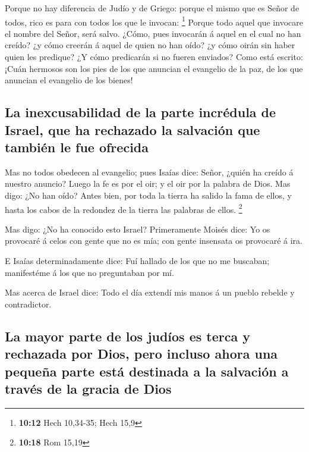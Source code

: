  Porque no hay diferencia de Judío y de Griego: porque el
mismo que es Señor de todos, rico es para con todos los que le invocan:
\footnote{\textbf{10:12} Hech 10,34-35; Hech 15,9}  Porque
todo aquel que invocare el nombre del Señor, será salvo. 
¿Cómo, pues invocarán á aquel en el cual no han creído? ¿y cómo creerán
á aquel de quien no han oído? ¿y cómo oirán sin haber quien les
predique?  ¿Y cómo predicarán si no fueren enviados? Como
está escrito: ¡Cuán hermosos son los pies de los que anuncian el
evangelio de la paz, de los que anuncian el evangelio de los bienes!

\hypertarget{la-inexcusabilidad-de-la-parte-incruxe9dula-de-israel-que-ha-rechazado-la-salvaciuxf3n-que-tambiuxe9n-le-fue-ofrecida}{%
\subsection{La inexcusabilidad de la parte incrédula de Israel, que ha
rechazado la salvación que también le fue
ofrecida}\label{la-inexcusabilidad-de-la-parte-incruxe9dula-de-israel-que-ha-rechazado-la-salvaciuxf3n-que-tambiuxe9n-le-fue-ofrecida}}

 Mas no todos obedecen al evangelio; pues Isaías dice:
Señor, ¿quién ha creído á nuestro anuncio?  Luego la fe es
por el oir; y el oir por la palabra de Dios.  Mas digo: ¿No
han oído? Antes bien, por toda la tierra ha salido la fama de ellos, y
hasta los cabos de la redondez de la tierra las palabras de ellos.
\footnote{\textbf{10:18} Rom 15,19}

 Mas digo: ¿No ha conocido esto Israel? Primeramente Moisés
dice: Yo os provocaré á celos con gente que no es mía; con gente
insensata os provocaré á ira.

 E Isaías determinadamente dice: Fuí hallado de los que no
me buscaban; manifestéme á los que no preguntaban por mí.

 Mas acerca de Israel dice: Todo el día extendí mis manos á
un pueblo rebelde y contradictor.

\hypertarget{la-mayor-parte-de-los-juduxedos-es-terca-y-rechazada-por-dios-pero-incluso-ahora-una-pequeuxf1a-parte-estuxe1-destinada-a-la-salvaciuxf3n-a-travuxe9s-de-la-gracia-de-dios}{%
\subsection{La mayor parte de los judíos es terca y rechazada por Dios,
pero incluso ahora una pequeña parte está destinada a la salvación a
través de la gracia de
Dios}\label{la-mayor-parte-de-los-juduxedos-es-terca-y-rechazada-por-dios-pero-incluso-ahora-una-pequeuxf1a-parte-estuxe1-destinada-a-la-salvaciuxf3n-a-travuxe9s-de-la-gracia-de-dios}}

